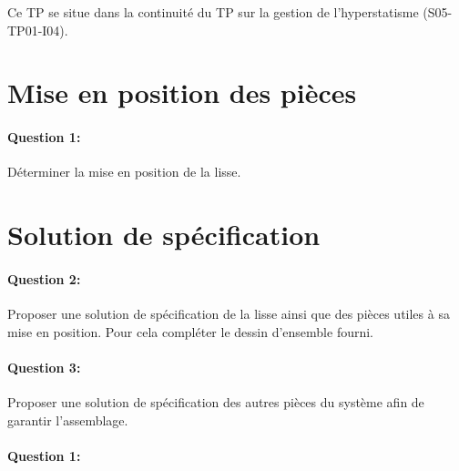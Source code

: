 

\cleardoublepage

Ce TP se situe dans la continuité du TP sur la gestion de l'hyperstatisme (S05-TP01-I04).

\section{Mise en position des pièces}

\paragraph{Question 1:} Déterminer la mise en position de la lisse.

\reponse[4]

\section{Solution de spécification}

\paragraph{Question 2:} Proposer une solution de spécification de la lisse ainsi que des pièces utiles à sa mise en position. Pour cela compléter le dessin d'ensemble fourni.

\paragraph{Question 3:} Proposer une solution de spécification des autres pièces du système afin de garantir l'assemblage.





\pagestyle{correction}\setcounter{section}{0}

\paragraph{Question 1:}
